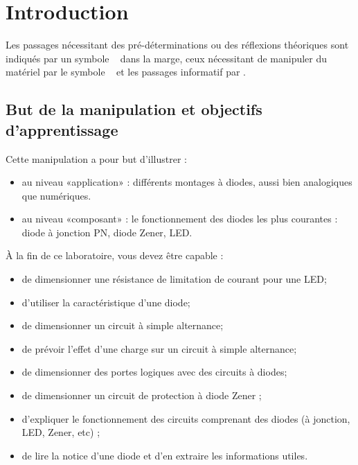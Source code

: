 \documentclass{../template/labo}
\author{The Fantastic Four}
\begin{document}

\section{Introduction}

Les passages nécessitant des pré-déterminations ou des réflexions théoriques sont indiqués par un symbole \faCogs~ dans la marge,
ceux nécessitant de manipuler du matériel par le symbole \faFlask~ et les passages informatif par \faLightbulbO.


\subsection{But de la manipulation et objectifs d'apprentissage}
Cette manipulation a pour but d'illustrer :
\begin{itemize}
\item au niveau «application» : différents montages à diodes, aussi bien analogiques que numériques. 
\item au niveau «composant» : le fonctionnement des diodes les plus courantes : diode à jonction PN, diode Zener, LED.
\end{itemize}

À la fin de ce laboratoire, vous devez être capable :
\begin{itemize}
\item de dimensionner une résistance de limitation de courant pour une LED; 
\item d'utiliser la caractéristique d'une diode;
\item de dimensionner un circuit à simple alternance; 
\item de prévoir l'effet d'une charge sur un circuit à simple alternance;
\item de dimensionner des portes logiques avec des circuits à diodes; 
\item de dimensionner un circuit de protection à diode Zener ;
\item d'expliquer le fonctionnement des circuits comprenant des diodes (à jonction, LED, Zener, etc) ;
\item de lire la notice d'une diode et d'en extraire les informations utiles. 
\end{itemize}
\end{document}
